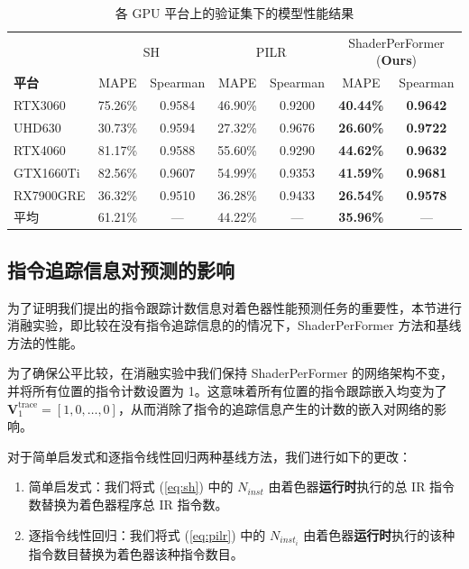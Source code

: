 \begin{table}[h]
    \centering
    \caption{各 GPU 平台上的验证集下的模型性能结果}
    \label{table:mainResults}
    \begin{tabular}{l|cccccc}
    \toprule
        ~  & \multicolumn{2}{c}{SH} & \multicolumn{2}{c}{PILR} & \multicolumn{2}{c}{ShaderPerFormer (\textbf{Ours})} \\ 
        \textbf{平台}          & MAPE & Spearman & MAPE & Spearman & MAPE & Spearman \\
    \midrule
        RTX3060 &  75.26\% & 0.9584 &  46.90\% & 0.9200 & \textbf{40.44\%} & \textbf{0.9642} \\
        UHD630 &  30.73\% & 0.9594 &  27.32\% & 0.9676 & \textbf{26.60\%} & \textbf{0.9722} \\
        RTX4060 &  81.17\% & 0.9588 &  55.60\% & 0.9290 & \textbf{44.62\%} & \textbf{0.9632} \\
        GTX1660Ti &  82.56\% & 0.9607 &  54.99\% & 0.9353 & \textbf{41.59\%} & \textbf{0.9681} \\
        RX7900GRE &  36.32\% & 0.9510 &  36.28\% & 0.9433 & \textbf{26.54\%} & \textbf{0.9578} \\
    \midrule
        平均 & 61.21\% & --- & 44.22\% & --- & \textbf{35.96\%} & --- \\
    \bottomrule
    \end{tabular}
\end{table}

\subsection{指令追踪信息对预测的影响}

为了证明我们提出的指令跟踪计数信息对着色器性能预测任务的重要性，本节进行消融实验，即比较在没有指令追踪信息的的情况下，ShaderPerFormer 方法和基线方法的性能。

为了确保公平比较，在消融实验中我们保持 ShaderPerFormer 的网络架构不变，并将所有位置的指令计数设置为 1。这意味着所有位置的指令跟踪嵌入均变为了 $\mathbf{V}^\text{trace}_{1} = [1, 0, \dots, 0]$，从而消除了指令的追踪信息产生的计数的嵌入对网络的影响。

对于简单启发式和逐指令线性回归两种基线方法，我们进行如下的更改：
\begin{enumerate}
    \item 简单启发式：我们将式 (\ref{eq:sh}) 中的 $N_{inst}$ 由着色器\textbf{运行时}执行的总 IR 指令数替换为着色器程序总 IR 指令数。
    \item 逐指令线性回归：我们将式 (\ref{eq:pilr}) 中的 $N_{inst_i}$ 由着色器\textbf{运行时}执行的该种指令数目替换为着色器该种指令数目。 
\end{enumerate}

